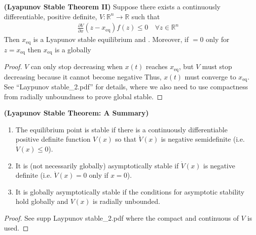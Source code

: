 \documentclass{article}
\newcommand{\bfs}[1]{\textbf{({#1}) }}
\begin{document}
\begin{thma}\bfs{Lyapunov Stable Theorem II}
Suppose there exists a continuously differentiable, positive definite,  $V: \mathbb{R}^{n} \rightarrow \mathbb{R}$ such that
\begin{align*}
\frac{\partial V}{\partial x}\left(z-x_{\mathrm{eq}}\right) f(z) \leq 0 \quad \forall z \in \mathbb{R}^{n}
\end{align*}
Then $x_{\mathrm {eq}}$ is a Lyapunov stable equilibrium and . Moreover, if $=0$ only for $z=x_{\mathrm{eq}}$ then $x_{\mathrm{eq}}$ is a globally 
\end{thma}
\begin{proof}
$V$ can only stop decreasing when $x(t)$ reaches $x_{\mathrm {eq}}$, but $V$ must stop decreasing because it cannot become negative Thus, $x(t)$ must converge to $x_{\mathrm{eq}}$. See ``Laypunov stable\_2.pdf'' for details, where we also need to use compactness from radially unboundness to prove global stable.
\end{proof}
\begin{thma}\bfs{Lyapunov Stable Theorem: A Summary}
\begin{enumerate}
    \item The equilibrium point is stable if there is a continuously differentiable positive definite function $V(x)$ so that $\dot{V}(x)$ is negative semidefinite (i.e. $\dot{V}(x)\le 0$).
    \item It is (not necessarily globally) asymptotically stable if $\dot{V}(x)$ is negative definite (i.e. $\dot{V}(x)=0$ only if $x=0$).
    \item It is globally asymptotically stable if the conditions for asymptotic stability hold globally and $V(x)$ is radially unbounded.
\end{enumerate}
\end{thma}
\begin{proof}
See supp Laypunov stable\_2.pdf where the compact and continuous of $V$ is used.
\end{proof}
\end{document}
